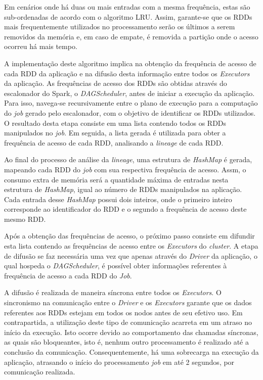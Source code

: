 Em cenários onde há duas ou mais entradas com a mesma frequência, estas são sub-ordenadas de acordo com o algoritmo LRU. Assim, garante-se que os RDDs mais frequentemente utilizados no processamento serão os últimos a serem removidos da memória e, em caso de empate, é removida a partição onde o acesso ocorreu há mais tempo.

A implementação deste algoritmo implica na obtenção da frequência de acesso de cada RDD da aplicação e na difusão desta informação entre todos os \textit{Executors} da aplicação. As frequências de acesso dos RDDs são obtidas através do escalonador do Spark, o \textit{DAGScheduler}, antes de iniciar a execução da aplicação. Para isso, navega-se recursivamente entre o plano de execução para a computação do \textit{job} gerado pelo escalonador, com o objetivo de identificar os RDDs utilizados. O resultado desta etapa consiste em uma lista contendo todos os RDDs manipulados no \textit{job}. Em seguida, a lista gerada é utilizada para obter a frequência de acesso de cada RDD, analisando a \textit{lineage} de cada RDD. 

Ao final do processo de análise da \textit{lineage}, uma estrutura de  \textit{HashMap} é gerada, mapeando cada RDD do \textit{job} com sua respectiva frequência de acesso. Assm, o consumo extra de memória será a quantidade máxima de entradas nesta estrutura de \textit{HashMap}, igual ao número de RDDs manipulados na aplicação. Cada entrada desse \textit{HashMap} possui dois inteiros, onde o primeiro inteiro corresponde ao identificador do RDD e o segundo a frequência de acesso deste mesmo RDD.

Após a obtenção das frequências de acesso, o próximo passo consiste em difundir esta lista contendo as frequências de acesso entre os \textit{Executors} do \textit{cluster}. A etapa de difusão se faz necessária uma vez que apenas através do \textit{Driver} da aplicação, o qual hospeda o \textit{DAGScheduler}, é possível obter informações referentes à frequência de acesso a cada RDD do \textit{Job}. 

A difusão é realizada de maneira síncrona entre todos os \textit{Executors}. O sincronismo na comunicação entre o \textit{Driver} e os \textit{Executors} garante que os dados referentes aos RDDs estejam em todos os nodos antes de seu efetivo uso. Em contrapartida, a utilização deste tipo de comunicação acarreta em um atraso no início da execução. Isto ocorre devido ao comportamento das chamadas síncronas, as quais são bloqueantes, isto é, nenhum outro processamento é realizado até a conclusão da comunicação. Consequentemente, há uma sobrecarga na execução da aplicação, atrasando o início do processamento \textit{job} em até 2 segundos, por comunicação realizada.

